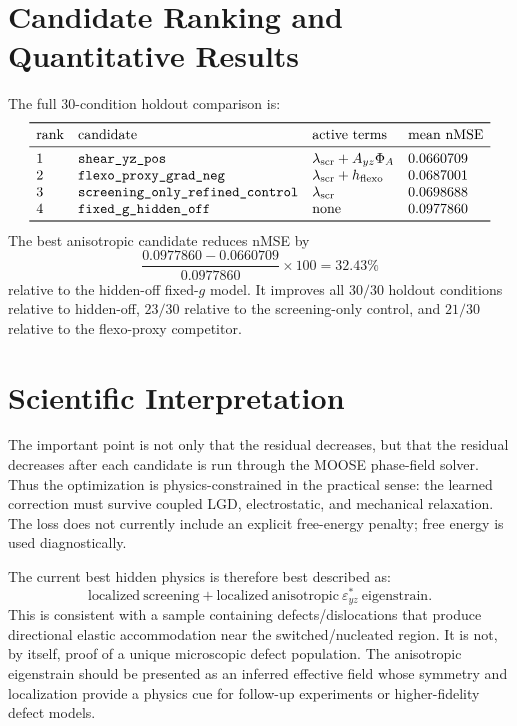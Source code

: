 \documentclass[11pt]{article}
\newcommand{\eps}{\varepsilon}
\begin{document}
\section{Candidate Ranking and Quantitative Results}

The full 30-condition holdout comparison is:
\[
\begin{array}{llll}
\toprule
\mathrm{rank} & \mathrm{candidate} & \mathrm{active~terms} & \mathrm{mean~nMSE}\\
\midrule
1 & \texttt{shear\_yz\_pos} &
  \lambda_{\mathrm{scr}} + A_{yz}\Phi_A & 0.0660709\\
2 & \texttt{flexo\_proxy\_grad\_neg} &
  \lambda_{\mathrm{scr}} + h_{\mathrm{flexo}} & 0.0687001\\
3 & \texttt{screening\_only\_refined\_control} &
  \lambda_{\mathrm{scr}} & 0.0698688\\
4 & \texttt{fixed\_g\_hidden\_off} &
  \mathrm{none} & 0.0977860\\
\bottomrule
\end{array}
\]
The best anisotropic candidate reduces nMSE by
\[
  \frac{0.0977860-0.0660709}{0.0977860}\times 100
  =
  32.43\%
\]
relative to the hidden-off fixed-\(g\) model.  It improves all
\(30/30\) holdout conditions relative to hidden-off, \(23/30\) relative to the
screening-only control, and \(21/30\) relative to the flexo-proxy competitor.

\section{Scientific Interpretation}

The important point is not only that the residual decreases, but that the
residual decreases after each candidate is run through the MOOSE phase-field
solver.  Thus the optimization is physics-constrained in the practical sense:
the learned correction must survive coupled LGD, electrostatic, and mechanical
relaxation.  The loss does not currently include an explicit free-energy
penalty; free energy is used diagnostically.

The current best hidden physics is therefore best described as:
\[
  \boxed{
    \mathrm{localized~screening}
    +
    \mathrm{localized~anisotropic~} \eps_{yz}^{*}
    \mathrm{~eigenstrain}
  }.
\]
This is consistent with a sample containing defects/dislocations that produce
directional elastic accommodation near the switched/nucleated region.  It is
not, by itself, proof of a unique microscopic defect population.  The
anisotropic eigenstrain should be presented as an inferred effective field
whose symmetry and localization provide a physics cue for follow-up
experiments or higher-fidelity defect models.
\end{document}
